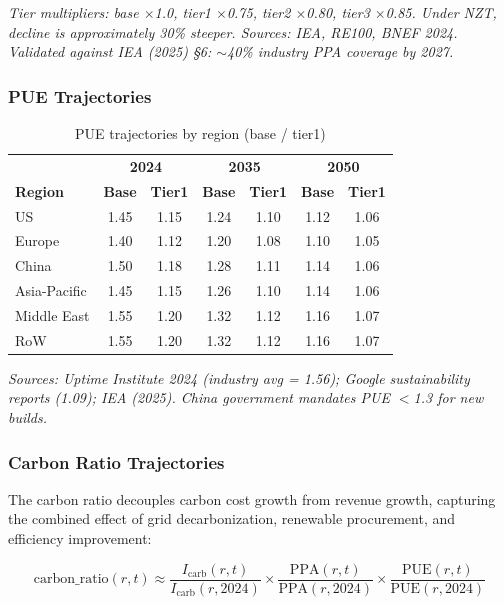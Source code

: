 \small\textit{Tier multipliers: base $\times$1.0, tier1 $\times$0.75, tier2 $\times$0.80, tier3 $\times$0.85. Under NZT, decline is approximately 30\% steeper. Sources: IEA, RE100, BNEF 2024. Validated against IEA (2025) \S6: $\sim$40\% industry PPA coverage by 2027.}
\normalsize

\subsubsection{PUE Trajectories}

\begin{table}[H]
\centering
\small
\caption{PUE trajectories by region (base / tier1)}
\label{tab:app_pue}
\begin{tabular}{@{}lcc|cc|cc@{}}
\toprule
& \multicolumn{2}{c|}{\textbf{2024}} & \multicolumn{2}{c|}{\textbf{2035}} & \multicolumn{2}{c}{\textbf{2050}} \\
\textbf{Region} & \textbf{Base} & \textbf{Tier1} & \textbf{Base} & \textbf{Tier1} & \textbf{Base} & \textbf{Tier1} \\
\midrule
US & 1.45 & 1.15 & 1.24 & 1.10 & 1.12 & 1.06 \\
Europe & 1.40 & 1.12 & 1.20 & 1.08 & 1.10 & 1.05 \\
China & 1.50 & 1.18 & 1.28 & 1.11 & 1.14 & 1.06 \\
Asia-Pacific & 1.45 & 1.15 & 1.26 & 1.10 & 1.14 & 1.06 \\
Middle East & 1.55 & 1.20 & 1.32 & 1.12 & 1.16 & 1.07 \\
RoW & 1.55 & 1.20 & 1.32 & 1.12 & 1.16 & 1.07 \\
\bottomrule
\end{tabular}
\end{table}

\small\textit{Sources: Uptime Institute 2024 (industry avg = 1.56); Google sustainability reports (1.09); IEA (2025). China government mandates PUE $<$1.3 for new builds.}
\normalsize

\subsubsection{Carbon Ratio Trajectories}

The carbon ratio decouples carbon cost growth from revenue growth, capturing the combined effect of grid decarbonization, renewable procurement, and efficiency improvement:

$$\text{carbon\_ratio}(r, t) \approx \frac{I_{\text{carb}}(r, t)}{I_{\text{carb}}(r, 2024)} \times \frac{\text{PPA}(r, t)}{\text{PPA}(r, 2024)} \times \frac{\text{PUE}(r, t)}{\text{PUE}(r, 2024)}$$

